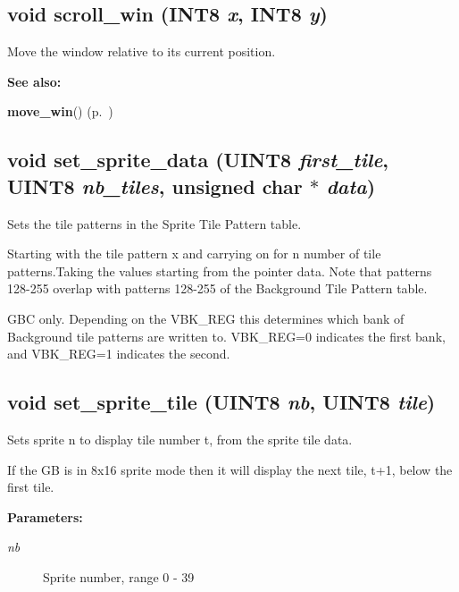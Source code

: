 \subsection{\setlength{\rightskip}{0pt plus 5cm}void scroll\_\-win ({\bf INT8} {\em x}, {\bf INT8} {\em y})}

Move the window relative to its current position.

\begin{Desc}
\item[{\bf See also: }]\par
{\bf move\_\-win}() {\rm (p.~\pageref{gb.h_a86})} \end{Desc}
\label{gb.h_a88}
\subsection{\setlength{\rightskip}{0pt plus 5cm}void set\_\-sprite\_\-data ({\bf UINT8} {\em first\_\-tile}, {\bf UINT8} {\em nb\_\-tiles}, unsigned char $\ast$ {\em data})}

Sets the tile patterns in the Sprite Tile Pattern table.

Starting with the tile pattern x and carrying on for n number of tile patterns.Taking the values starting from the pointer data. Note that patterns 128-255 overlap with patterns 128-255 of the Background Tile Pattern table.

GBC only. Depending on the VBK\_\-REG this determines which bank of Background tile patterns are written to. VBK\_\-REG=0 indicates the first bank, and VBK\_\-REG=1 indicates the second. \label{gb.h_a90}
\subsection{\setlength{\rightskip}{0pt plus 5cm}void set\_\-sprite\_\-tile ({\bf UINT8} {\em nb}, {\bf UINT8} {\em tile})}

Sets sprite n to display tile number t, from the sprite tile data.

If the GB is in 8x16 sprite mode then it will display the next tile, t+1, below the first tile. \begin{Desc}
\item[{\bf Parameters: }]\par
\begin{description}
\item[
{\em nb}] Sprite number, range 0 - 39 \end{description}
\end{Desc}
\label{gb.h_a92}
